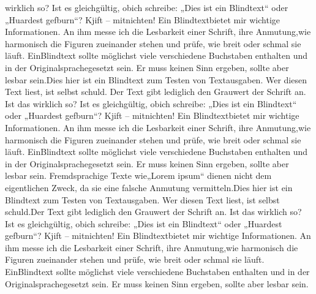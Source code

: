 wirklich so? Ist es gleichgültig, obich schreibe: „Dies ist ein Blindtext“ oder „Huardest gefburn“? Kjift – mitnichten! 
Ein Blindtextbietet mir wichtige Informationen. An ihm messe ich die Lesbarkeit einer Schrift, ihre Anmutung,wie 
harmonisch die Figuren zueinander stehen und prüfe, wie breit oder schmal sie läuft. EinBlindtext sollte möglichst viele 
verschiedene Buchstaben enthalten und in der Originalsprachegesetzt sein. Er muss keinen Sinn ergeben, sollte aber lesbar 
sein.Dies hier ist ein Blindtext zum Testen von Textausgaben. Wer diesen Text liest, ist selbst schuld.
Der Text gibt lediglich den Grauwert der Schrift an. Ist das wirklich so? Ist es gleichgültig, obich schreibe:
„Dies ist ein Blindtext“ oder „Huardest gefburn“? Kjift – mitnichten! Ein Blindtextbietet mir wichtige Informationen. 
An ihm messe ich die Lesbarkeit einer Schrift, ihre Anmutung,wie harmonisch die Figuren zueinander stehen und prüfe, 
wie breit oder schmal sie läuft. EinBlindtext sollte möglichst viele verschiedene Buchstaben enthalten und in der 
Originalsprachegesetzt sein. Er muss keinen Sinn ergeben, sollte aber lesbar sein. Fremdsprachige Texte wie„Lorem ipsum“ 
dienen nicht dem eigentlichen Zweck, da sie eine falsche Anmutung vermitteln.Dies hier ist ein Blindtext zum Testen von 
Textausgaben. Wer diesen Text liest, ist selbst schuld.Der Text gibt lediglich den Grauwert der Schrift an. Ist das 
wirklich so? Ist es gleichgültig, obich schreibe: „Dies ist ein Blindtext“ oder „Huardest gefburn“? Kjift – mitnichten! 
Ein Blindtextbietet mir wichtige Informationen. An ihm messe ich die Lesbarkeit einer Schrift, ihre Anmutung,wie 
harmonisch die Figuren zueinander stehen und prüfe, wie breit oder schmal sie läuft. EinBlindtext sollte möglichst viele 
verschiedene Buchstaben enthalten und in der Originalsprachegesetzt sein. Er muss keinen Sinn ergeben, sollte aber lesbar 
sein.
